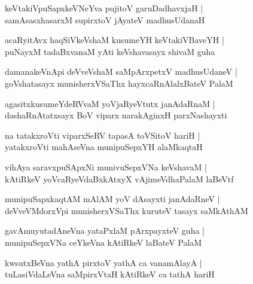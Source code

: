 \documentclass[twoside,12pt,openright]{book}
\newcounter{shloka}[chapter]
\begin{document}
\begin{shloka}%
keVtakiVpuSapxkeVNeYva pujitoV garuDadhavxjaH |\\
samAsasxhasarxM supirxtoV jAyateV madhusUdanaH
\end{shloka}

\begin{shloka}%
acaRyitAvx haqSiVkeVshaM kusumeYH keVtakiVBaveYH |\\
puNayxM tadaBxvanaM yAti keVshavasayx shivaM guha
\end{shloka}

\begin{shloka}%
damanakeVnApi deVveVshaM saMpArxpetxV madhusUdaneV |\\
goVshatasayx munisherxVSaThx hayxcaRnAlalxBateV PalaM 
\end{shloka}

\begin{shloka}%
agasitxkusumeYdeRVvaM yoVjaRyeVtutx janAdaRnaM |\\
dashaRnAtatxsayx BoV viparx narakAginxH parxNashayxti
\end{shloka}

\begin{shloka}%
na tatakxroVti viparxSeRV tapasA toVSitoV hariH |\\
yatakxroVti mahAseVna munipuSepxYH alaMkaqtaH 
\end{shloka}

\begin{shloka}%
vihAya saravxpuSApxNi munivuSepxVNa keVshavaM |\\
kAtiRkeV yoVcaRyeVdaBxkAtxyX vAjimeVdhaPalaM laBeVtf
\end{shloka}

\begin{shloka}%
munipuSapxkaqtAM mAlAM yoV dAsayxti janAdaRneV |\\
deVveVMdorxVpi munisherxVSaThx kuruteV tasayx saMkAthAM 
\end{shloka}

\begin{shloka}%
gavAmuyutadAneVna yataPxlaM pArxpayxteV guha |\\
munipuSepxVNa ceYkeVna kAtiRkeV laBateV PalaM
\end{shloka}

\begin{shloka}%
kwsutxBeVna yathA pirxtoV yathA ca vanamAlayA |\\
tuLasiVdaLeVna saMpirxVtaH kAtiRkeV ca tathA hariH 
\end{shloka}
\end{document}
